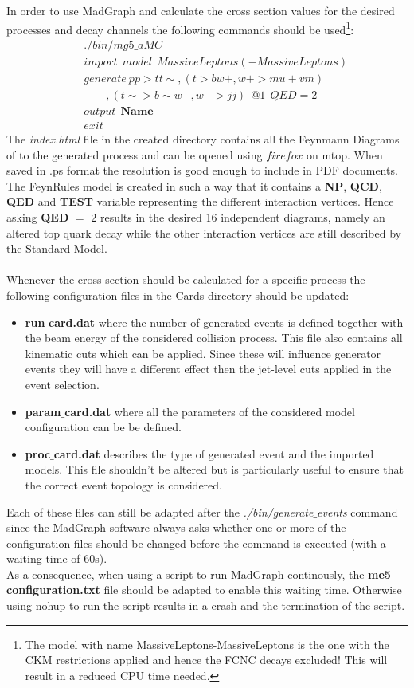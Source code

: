 In order to use MadGraph and calculate the cross section values for the desired processes and decay channels the following commands should be used\footnote{The model with name MassiveLeptons-MassiveLeptons is the one with the CKM restrictions applied and hence the FCNC decays excluded! This will result in a reduced CPU time needed.}:
\begin{eqnarray}
 & & ./bin/mg5\_aMC \nonumber\\
 & & import ~~ model ~~ MassiveLeptons(-MassiveLeptons) \nonumber\\
 & &  generate ~ p p > t t\sim , ( t > b w+ , w+ > mu+ vm ) \nonumber \\
 & &  \qquad, ( t\sim > b\sim w- , w- > j j )~~ @1 ~~ QED = 2 \nonumber\\
 & & output ~~ \textbf{Name} \nonumber\\
 & & exit \nonumber
\end{eqnarray}
The \textit{index.html} file in the created directory contains all the Feynmann Diagrams of to the generated process and can be opened using $firefox$ on mtop. When saved in .ps format the resolution is good enough to include in PDF documents.\\
The FeynRules model is created in such a way that it contains a \textbf{NP}, \textbf{QCD}, \textbf{QED} and \textbf{TEST} variable representing the different interaction vertices. Hence asking \textbf{QED} $=$ $2$ results in the desired 16 independent diagrams, namely an altered top quark decay while the other interaction vertices are still described by the Standard Model.\\
\\
Whenever the cross section should be calculated for a specific process the following configuration files in the Cards directory should be updated:
\begin{itemize}
 \item \textbf{run$\_$card.dat} where the number of generated events is defined together with the beam energy of the considered collision process. This file also contains all kinematic cuts which can be applied. Since these will influence generator events they will have a different effect then the jet-level cuts applied in the event selection.
 \item \textbf{param$\_$card.dat} where all the parameters of the considered model configuration can be be defined.
 \item \textbf{proc$\_$card.dat} describes the type of generated event and the imported models. This file shouldn't be altered but is particularly useful to ensure that the correct event topology is considered.
\end{itemize}
Each of these files can still be adapted after the \textit{./bin/generate$\_$events} command since the MadGraph software always asks whether one or more of the configuration files should be changed before the command is executed (with a waiting time of 60s).\\
As a consequence, when using a script to run MadGraph continously, the \textbf{me5$\_$configuration.txt} file should be adapted to enable this waiting time. Otherwise using nohup to run the script results in a crash and the termination of the script.

